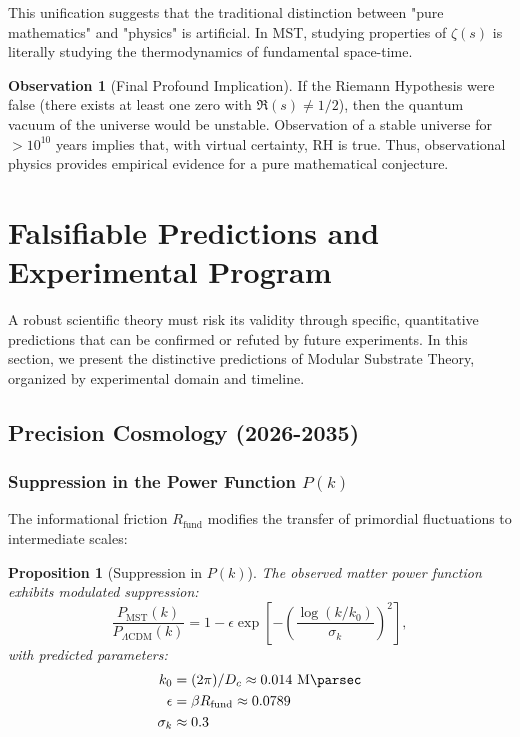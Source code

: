 \documentclass[11pt, a4paper]{article}
\theoremstyle{plain}
\newtheorem{proposition}[theorem]{Proposition}
\theoremstyle{definition}
\newtheorem{observation}[theorem]{Observation}
\newcommand{\Rfactor}{R_{\text{fund}}}
\begin{document}
This unification suggests that the traditional distinction between "pure mathematics" and "physics" is artificial. In MST, studying properties of $\zeta(s)$ is literally studying the thermodynamics of fundamental space-time.

\begin{observation}[Final Profound Implication]
If the Riemann Hypothesis were false (there exists at least one zero with $\Re(s) \neq 1/2$), then the quantum vacuum of the universe would be unstable. Observation of a stable universe for $>10^{10}$ years implies that, with virtual certainty, RH is true. Thus, observational physics provides empirical evidence for a pure mathematical conjecture.
\end{observation}


\section{Falsifiable Predictions and Experimental Program}
\label{sec:predictions}

A robust scientific theory must risk its validity through specific, quantitative predictions that can be confirmed or refuted by future experiments. In this section, we present the distinctive predictions of Modular Substrate Theory, organized by experimental domain and timeline.

\subsection{Precision Cosmology (2026-2035)}

\subsubsection{Suppression in the Power Function \texorpdfstring{$P(k)$}{P(k)}}

The informational friction $\Rfactor$ modifies the transfer of primordial fluctuations to intermediate scales:

\begin{proposition}[Suppression in $P(k)$]
The observed matter power function exhibits modulated suppression:
\begin{equation}
\frac{P_{\text{MST}}(k)}{P_{\Lambda\text{CDM}}(k)} = 1 - \epsilon \exp\left[-\left(\frac{\log(k/k_0)}{\sigma_k}\right)^2\right],
\end{equation}
with predicted parameters:
\begin{align*}
k_0 &= (2\pi)/D_c \approx 0.014\ \si{\per\mega\parsec} \\
\epsilon &= \beta\Rfactor \approx 0.0789 \\
\sigma_k &\approx 0.3
\end{align*}
\end{proposition}
\end{document}
